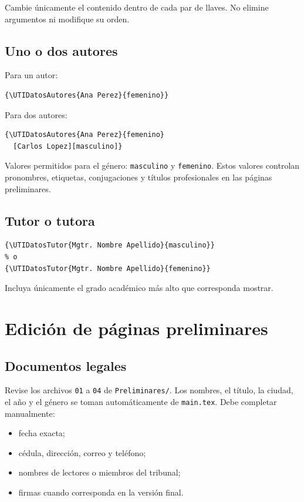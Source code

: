 \documentclass[12pt,a4paper,oneside]{report}
\begin{document}
Cambie únicamente el contenido dentro de cada par de llaves. No elimine argumentos ni modifique su orden.

\section{Uno o dos autores}

Para un autor:

\begin{lstlisting}
{\UTIDatosAutores{Ana Perez}{femenino}}
\end{lstlisting}

Para dos autores:

\begin{lstlisting}
{\UTIDatosAutores{Ana Perez}{femenino}
  [Carlos Lopez][masculino]}
\end{lstlisting}

Valores permitidos para el género: \texttt{masculino} y \texttt{femenino}. Estos valores controlan pronombres, etiquetas, conjugaciones y títulos profesionales en las páginas preliminares.

\section{Tutor o tutora}

\begin{lstlisting}
{\UTIDatosTutor{Mgtr. Nombre Apellido}{masculino}}
% o
{\UTIDatosTutor{Mgtr. Nombre Apellido}{femenino}}
\end{lstlisting}

Incluya únicamente el grado académico más alto que corresponda mostrar.

\chapter{Edición de páginas preliminares}

\section{Documentos legales}

Revise los archivos \texttt{01} a \texttt{04} de \texttt{Preliminares/}. Los nombres, el título, la ciudad, el año y el género se toman automáticamente de \texttt{main.tex}. Debe completar manualmente:

\begin{itemize}
  \item fecha exacta;
  \item cédula, dirección, correo y teléfono;
  \item nombres de lectores o miembros del tribunal;
  \item firmas cuando corresponda en la versión final.
\end{itemize}
\end{document}
